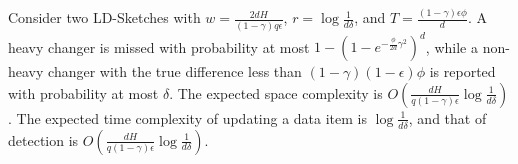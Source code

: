 \begin{theorem}
Consider two LD-Sketches with $w=\frac{2dH}{(1-\gamma)q\epsilon}$,
$r=\log{\frac{1}{d\delta}}$, and $T=\frac{(1-\gamma)\epsilon\phi}{d}$.
A heavy changer is missed with probability at most
$1-(1-e^{-\frac{\phi}{2d}\gamma^2})^d$, while a non-heavy changer with the true
difference less than $(1-\gamma)(1-\epsilon)\phi$ is reported with probability
at most $\delta$.  The expected space complexity is
$O(\frac{dH}{q(1-\gamma)\epsilon}\log{\frac{1}{d\delta}})$.
The expected time complexity of updating a data item is
$\log{\frac{1}{d\delta}}$, and that of detection is
$O(\frac{dH}{q(1-\gamma)\epsilon}\log{\frac{1}{d\delta}})$.
\end{theorem}
